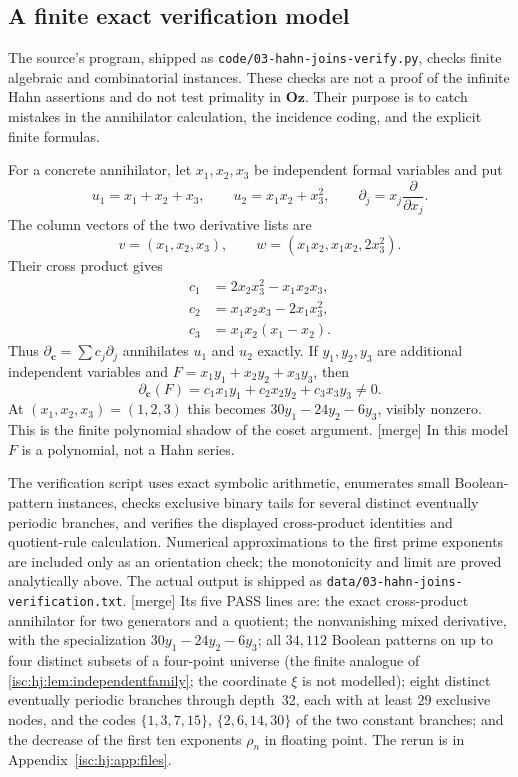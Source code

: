 \documentclass[11pt,letterpaper]{article}
\theoremstyle{definition}
\theoremstyle{remark}
\newcommand{\Oz}{\mathbf{Oz}}
\newcommand{\rpath}[1]{\nolinkurl{#1}}%
\newcommand{\mtag}{\textup{[merge]}}%
\numberwithin{equation}{section}
\begin{document}
\subsection{A finite exact verification model}\label{isc:hj:sub:verification}

The source's program, shipped as \rpath{code/03-hahn-joins-verify.py},
checks finite algebraic and combinatorial instances. These checks are not a
proof of the infinite Hahn assertions and do not test primality in $\Oz$.
Their purpose is to catch mistakes in the annihilator calculation, the
incidence coding, and the explicit finite formulas.

For a concrete annihilator, let $x_1,x_2,x_3$ be independent formal
variables and put
\[
 u_1=x_1+x_2+x_3,\qquad u_2=x_1x_2+x_3^2,
 \qquad \partial_j=x_j\frac{\partial}{\partial x_j}.
\]
The column vectors of the two derivative lists are
\[
 v=(x_1,x_2,x_3),\qquad
 w=(x_1x_2,x_1x_2,2x_3^2).
\]
Their cross product gives
\[
 \begin{aligned}
 c_1&=2x_2x_3^2-x_1x_2x_3,\\
 c_2&=x_1x_2x_3-2x_1x_3^2,\\
 c_3&=x_1x_2(x_1-x_2).
 \end{aligned}
\]
Thus $\partial_{\mathbf c}=\sum c_j\partial_j$ annihilates $u_1$ and $u_2$
exactly. If $y_1,y_2,y_3$ are additional independent variables and
$F=x_1y_1+x_2y_2+x_3y_3$, then
\[
 \partial_{\mathbf c}(F)=c_1x_1y_1+c_2x_2y_2+c_3x_3y_3\ne0.
\]
At $(x_1,x_2,x_3)=(1,2,3)$ this becomes
$30y_1-24y_2-6y_3$, visibly nonzero.
This is the finite polynomial shadow of the coset argument.
\mtag{} In this model $F$ is a polynomial, not a Hahn series.

The verification script uses exact symbolic arithmetic, enumerates
small Boolean-pattern instances, checks exclusive binary tails for
several distinct eventually periodic branches, and verifies the displayed
cross-product identities and quotient-rule calculation. Numerical
approximations to the first prime exponents are included only as an
orientation check; the monotonicity and limit are proved analytically
above. The actual output is shipped as
\rpath{data/03-hahn-joins-verification.txt}.
\mtag{} Its five PASS lines are: the exact cross-product annihilator for two
generators and a quotient; the nonvanishing mixed derivative, with the
specialization $30y_1-24y_2-6y_3$; all $34{,}112$ Boolean patterns on up to
four distinct subsets of a four-point universe (the finite analogue of
\cref{isc:hj:lem:independentfamily}; the coordinate $\xi$ is not modelled);
eight distinct eventually periodic branches through depth~32, each with at
least $29$ exclusive nodes, and the codes $\{1,3,7,15\}$, $\{2,6,14,30\}$ of
the two constant branches; and the decrease of the first ten exponents
$\rho_n$ in floating point. The rerun is in Appendix~\ref{isc:hj:app:files}.
\end{document}
